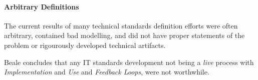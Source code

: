 %
%
%
%
%
%
%

\paragraph{Arbitrary Definitions}
\label{arbitrary_definitions_heading}

The current results of many technical standards definition efforts were often
arbitrary, contained bad modelling, and did not have proper statements of the
problem or rigourously developed technical artifacts.

Beale concludes that any IT standards development not being a \emph{live}
process with \emph{Implementation} and \emph{Use} and \emph{Feedback Loops},
were not worthwhile.
